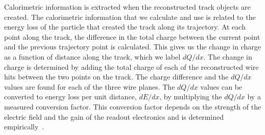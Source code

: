     Calorimetric information is extracted when the reconstructed track objects
    are created. The calorimetric information that we calculate and use is
    related to the energy loss of the particle that created the track along its
    trajectory. At each point along the track, the difference in the total
    charge between the current point and the previous trajectory point is
    calculated. This gives us the change in charge as a function of distance
    along the track, which we label $dQ/dx$. The change in charge is determined
    by adding the total charge of each of the reconstructed wire hits between
    the two points on the track. The charge difference and the $dQ/dx$ values
    are found for each of the three wire planes. The $dQ/dx$ values can be
    converted to energy loss per unit distance, $dE/dx$, by multiplying the
    $dQ/dx$ by a measured conversion factor. This conversion factor depends on
    the strength of the electric field and the gain of the readout electronics
    and is determined empirically~\cite{uBCalibrationNote}.


